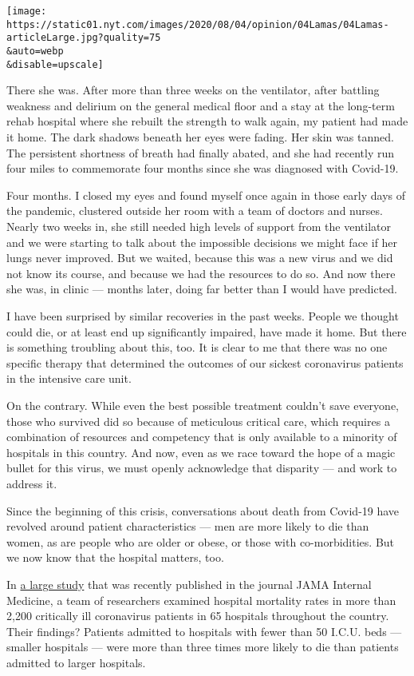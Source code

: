 \texttt{[image: https://static01.nyt.com/images/2020/08/04/opinion/04Lamas/04Lamas-articleLarge.jpg?quality=75\\\&auto=webp\\\&disable=upscale]}

There she was. After more than three weeks on the ventilator, after
battling weakness and delirium on the general medical floor and a stay
at the long-term rehab hospital where she rebuilt the strength to walk
again, my patient had made it home. The dark shadows beneath her eyes
were fading. Her skin was tanned. The persistent shortness of breath had
finally abated, and she had recently run four miles to commemorate four
months since she was diagnosed with Covid-19.

Four months. I closed my eyes and found myself once again in those early
days of the pandemic, clustered outside her room with a team of doctors
and nurses. Nearly two weeks in, she still needed high levels of support
from the ventilator and we were starting to talk about the impossible
decisions we might face if her lungs never improved. But we waited,
because this was a new virus and we did not know its course, and because
we had the resources to do so. And now there she was, in clinic ---
months later, doing far better than I would have predicted.

I have been surprised by similar recoveries in the past weeks. People we
thought could die, or at least end up significantly impaired, have made
it home. But there is something troubling about this, too. It is clear
to me that there was no one specific therapy that determined the
outcomes of our sickest coronavirus patients in the intensive care unit.

On the contrary. While even the best possible treatment couldn't save
everyone, those who survived did so because of meticulous critical care,
which requires a combination of resources and competency that is only
available to a minority of hospitals in this country. And now, even as
we race toward the hope of a magic bullet for this virus, we must openly
acknowledge that disparity --- and work to address it.

Since the beginning of this crisis, conversations about death from
Covid-19 have revolved around patient characteristics --- men are more
likely to die than women, as are people who are older or obese, or those
with co-morbidities. But we now know that the hospital matters, too.

In
\href{https://jamanetwork.com/journals/jamainternalmedicine/fullarticle/2768602}{a
large study} that was recently published in the journal JAMA Internal
Medicine, a team of researchers examined hospital mortality rates in
more than 2,200 critically ill coronavirus patients in 65 hospitals
throughout the country. Their findings? Patients admitted to hospitals
with fewer than 50 I.C.U. beds --- smaller hospitals --- were more than
three times more likely to die than patients admitted to larger
hospitals.

